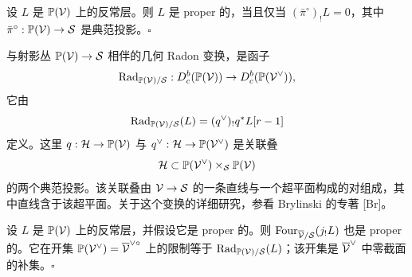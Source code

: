 \begin{lemmaZ}[0.3]
设 $L$ 是 $\Pv(\cV)$ 上的反常层。则 $L$ 是 proper 的，当且仅当 $(\bar\pi^\circ)_!L=0$，其中 $\bar\pi^\circ:\Pv(\cV)\to\cS$ 是典范投影。\hfill$\square$
\end{lemmaZ}

与射影丛 $\Pv(\cV)\to\cS$ 相伴的几何 Radon 变换，是函子
\[ \Rad_{\Pv(\cV)/\cS}:\Dbc(\Pv(\cV))\to\Dbc(\Pv(\cV^\vee)), \]
它由
\[ \Rad_{\Pv(\cV)/\cS}(L)=(q^\vee)_!q^*L[r-1] \]
定义。这里 $q:\cH\to\Pv(\cV)$ 与 $q^\vee:\cH\to\Pv(\cV^\vee)$ 是关联叠
\[ \cH\subset\Pv(\cV^\vee)\times_\cS\Pv(\cV) \]
的两个典范投影。该关联叠由 $\cV\to\cS$ 的一条直线与一个超平面构成的对组成，其中直线含于该超平面。关于这个变换的详细研究，参看 Brylinski 的专著 [Br]。

\begin{lemmaZ}[0.4]
设 $L$ 是 $\Pv(\cV)$ 上的反常层，并假设它是 proper 的。则 $\Four_{\overline{\cV}/\cS}(j_!L)$ 也是 proper 的。它在开集 $\Pv(\cV^\vee)=\overline{\cV}^{\vee\circ}$ 上的限制等于 $\Rad_{\Pv(\cV)/\cS}(L)$；该开集是 $\overline{\cV}^\vee$ 中零截面的补集。\hfill$\square$
\end{lemmaZ}
